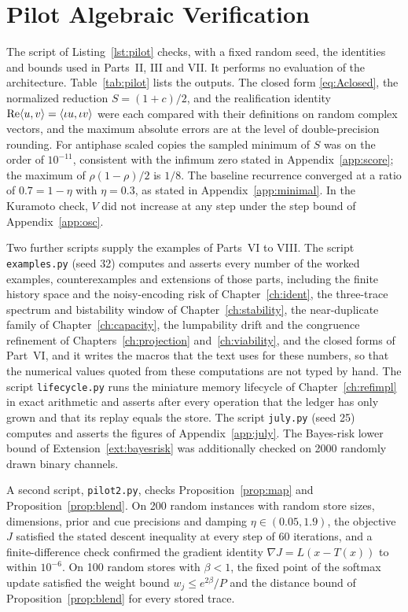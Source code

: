 \chapter{Pilot Algebraic Verification}\label{app:pilot}

The script of Listing~\ref{lst:pilot} checks, with a fixed random seed, the identities and bounds used in Parts~II, III and VII. It performs no evaluation of the architecture. Table~\ref{tab:pilot} lists the outputs. The closed form \eqref{eq:Aclosed}, the normalized reduction $S=(1+c)/2$, and the realification identity $\operatorname{Re}\langle u,v\rangle=\langle \iota u,\iota v\rangle$ were each compared with their definitions on random complex vectors, and the maximum absolute errors are at the level of double-precision rounding. For antiphase scaled copies the sampled minimum of $S$ was on the order of $10^{-11}$, consistent with the infimum zero stated in Appendix~\ref{app:score}; the maximum of $\rho(1-\rho)/2$ is $1/8$. The baseline recurrence converged at a ratio of $0.7=1-\eta$ with $\eta=0.3$, as stated in Appendix~\ref{app:minimal}. In the Kuramoto check, $V$ did not increase at any step under the step bound of Appendix~\ref{app:osc}.

Two further scripts supply the examples of Parts~VI to VIII. The script \texttt{examples.py} (seed 32) computes and asserts every number of the worked examples, counterexamples and extensions of those parts, including the finite history space and the noisy-encoding risk of Chapter~\ref{ch:ident}, the three-trace spectrum and bistability window of Chapter~\ref{ch:stability}, the near-duplicate family of Chapter~\ref{ch:capacity}, the lumpability drift and the congruence refinement of Chapters~\ref{ch:projection} and~\ref{ch:viability}, and the closed forms of Part~VI, and it writes the macros that the text uses for these numbers, so that the numerical values quoted from these computations are not typed by hand. The script \texttt{lifecycle.py} runs the miniature memory lifecycle of Chapter~\ref{ch:refimpl} in exact arithmetic and asserts after every operation that the ledger has only grown and that its replay equals the store. The script \texttt{july.py} (seed 25) computes and asserts the figures of Appendix~\ref{app:july}. The Bayes-risk lower bound of Extension~\ref{ext:bayesrisk} was additionally checked on 2000 randomly drawn binary channels. 

A second script, \texttt{pilot2.py}, checks Proposition~\ref{prop:map} and Proposition~\ref{prop:blend}. On 200 random instances with random store sizes, dimensions, prior and cue precisions and damping $\eta\in(0.05,1.9)$, the objective $J$ satisfied the stated descent inequality at every step of 60 iterations, and a finite-difference check confirmed the gradient identity $\nabla J=L(x-T(x))$ to within $10^{-6}$. On 100 random stores with $\beta<1$, the fixed point of the softmax update satisfied the weight bound $w_j\le e^{2\beta}/P$ and the distance bound of Proposition~\ref{prop:blend} for every stored trace.

